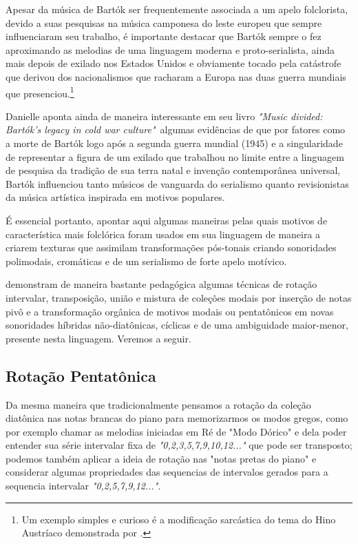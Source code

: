 \documentclass[
	12pt,				%
	openright,			%
	twoside,			%
	a4paper,			%
	english,			%
	french,				%
	spanish,			%
	brazil				%
	]{abntex2}
\begin{document}
Apesar da música de Bartók ser frequentemente associada a um apelo folclorista, devido a suas pesquisas na música camponesa do leste europeu que sempre influenciaram seu trabalho, é importante destacar que Bartók sempre o fez aproximando as melodias de uma linguagem moderna e proto-serialista, ainda mais depois de exilado nos Estados Unidos e obviamente tocado pela catástrofe que derivou dos nacionalismos que racharam a Europa nas duas guerra mundiais que presenciou.\footnote{Um exemplo simples e curioso é a modificação sarcástica do tema do Hino Austríaco demonstrada por . }

Danielle  aponta ainda de maneira interessante em seu livro \textit{"Music divided: Bartók's legacy in cold war culture"}\ algumas evidências de que por fatores como a morte de Bartók logo após a segunda guerra mundial (1945) e a singularidade de representar a figura de um exilado que trabalhou no limite entre a linguagem de pesquisa da tradição de sua terra natal e invenção contemporânea universal, Bartók influenciou tanto músicos de vanguarda do serialismo quanto revisionistas da música artística inspirada em motivos populares.

É essencial portanto, apontar aqui algumas maneiras pelas quais motivos de característica mais folclórica foram usados em sua linguagem de maneira a criarem texturas que assimilam transformações pós-tonais criando sonoridades polimodais, cromáticas e de um serialismo de forte apelo motívico.

 demonstram de maneira bastante pedagógica algumas técnicas de rotação intervalar, transposição, união e mistura de coleções modais por inserção de notas pivô e a transformação orgânica de motivos modais ou pentatônicos em novas sonoridades híbridas não-diatônicas, cíclicas e de uma ambiguidade maior-menor, presente nesta linguagem. Veremos a seguir.

\subsection{Rotação Pentatônica}
 
Da mesma maneira que tradicionalmente pensamos a rotação da coleção diatônica nas notas brancas do piano para memorizarmos os modos gregos, como por exemplo chamar as melodias iniciadas em Ré de "Modo Dórico" e dela poder entender sua série intervalar fixa de \textit{"0,2,3,5,7,9,10,12..."} que pode ser transposto; podemos também aplicar a ideia de rotação nas "notas pretas do piano" e considerar algumas propriedades das sequencias de intervalos gerados para a sequencia intervalar \textit{"0,2,5,7,9,12..."}.
\end{document}

